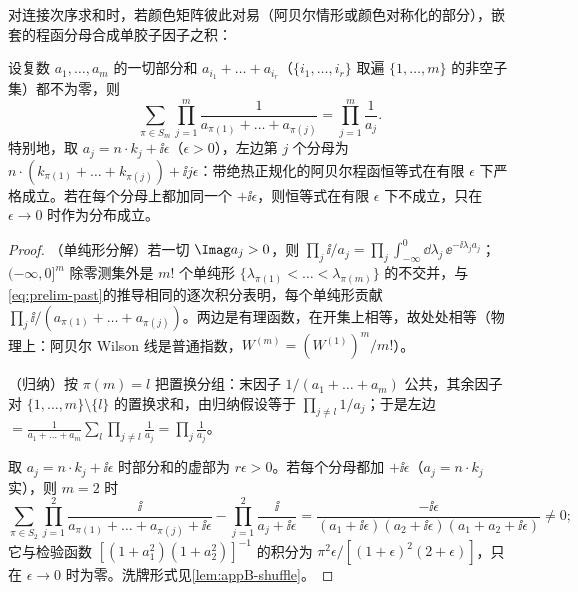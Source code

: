 对连接次序求和时，若颜色矩阵彼此对易（阿贝尔情形或颜色对称化的部分），嵌套的程函分母合成单胶子因子之积：

\begin{lemma}[程函恒等式]\label{lem:prelim-eikonal-identity}
设复数 $a_1,\dots,a_m$ 的一切部分和 $a_{i_1}+\dots+a_{i_r}$（$\{i_1,\dots,i_r\}$ 取遍 $\{1,\dots,m\}$ 的非空子集）都不为零，则
\begin{equation}\label{eq:prelim-eikonal}
\sum_{\pi\in S_m}\prod_{j=1}^m\frac1{a_{\pi(1)}+\dots+a_{\pi(j)}}=\prod_{j=1}^m\frac1{a_j} .
\end{equation}
特别地，取 $a_j=n\cdot k_j+\ii\epsilon$（$\epsilon>0$），左边第 $j$ 个分母为 $n\cdot(k_{\pi(1)}+\dots+k_{\pi(j)})+\ii j\epsilon$：带绝热正规化的阿贝尔程函恒等式在有限 $\epsilon$ 下严格成立。若在每个分母上都加同一个 $+\ii\epsilon$，则恒等式在有限 $\epsilon$ 下不成立，只在 $\epsilon\to0$ 时作为分布成立。%
\end{lemma}

\begin{proof}
（单纯形分解）若一切 $\Imag a_j>0$，则 $\prod_j\ii/a_j=\prod_j\int_{-\infty}^0\dd\lambda_j\,\ee^{-\ii\lambda_ja_j}$；$(-\infty,0]^m$ 除零测集外是 $m!$ 个单纯形 $\{\lambda_{\pi(1)}<\dots<\lambda_{\pi(m)}\}$ 的不交并，与\cref{eq:prelim-past}的推导相同的逐次积分表明，每个单纯形贡献 $\prod_j\ii/(a_{\pi(1)}+\dots+a_{\pi(j)})$。两边是有理函数，在开集上相等，故处处相等（物理上：阿贝尔 Wilson 线是普通指数，$W^{(m)}=(W^{(1)})^m/m!$）。

（归纳）按 $\pi(m)=l$ 把置换分组：末因子 $1/(a_1+\dots+a_m)$ 公共，其余因子对 $\{1,\dots,m\}\setminus\{l\}$ 的置换求和，由归纳假设等于 $\prod_{j\ne l}1/a_j$；于是左边 $=\frac1{a_1+\dots+a_m}\sum_l\prod_{j\ne l}\frac1{a_j}=\prod_j\frac1{a_j}$。

取 $a_j=n\cdot k_j+\ii\epsilon$ 时部分和的虚部为 $r\epsilon>0$。若每个分母都加 $+\ii\epsilon$（$a_j=n\cdot k_j$ 实），则 $m=2$ 时
\[
\sum_{\pi\in S_2}\prod_{j=1}^2\frac{\ii}{a_{\pi(1)}+\dots+a_{\pi(j)}+\ii\epsilon}-\prod_{j=1}^2\frac{\ii}{a_j+\ii\epsilon}=\frac{-\ii\epsilon}{(a_1+\ii\epsilon)(a_2+\ii\epsilon)(a_1+a_2+\ii\epsilon)}\ne0 ;
\]
它与检验函数 $[(1+a_1^2)(1+a_2^2)]^{-1}$ 的积分为 $\pi^2\epsilon/[(1+\epsilon)^2(2+\epsilon)]$，只在 $\epsilon\to0$ 时为零。洗牌形式见\cref{lem:appB-shuffle}。
\end{proof}

